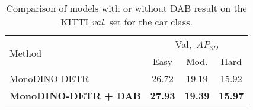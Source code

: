 \begin{table}[h]
\caption[Comparison of models with or without DAB result on the KITTI \textit{val.} set]{Comparison of models with or without DAB result on the KITTI \textit{val.} set for the car class.}
\centering
\small
\begin{tabular}{l|ccc}
\toprule
\multirow{2}{*}{Method} &  \multicolumn{3}{c}{Val,\ $AP_{3D}$} \\
& Easy & Mod. & Hard \\
\midrule
MonoDINO-DETR & 26.72 & 19.19 & 15.92\\
\textbf{MonoDINO-DETR {\small + DAB}} & \textbf{27.93} & \textbf{19.39} & \textbf{15.97} \\
\bottomrule
\end{tabular}
\label{tab:Ablation3_KITTI}
\end{table}